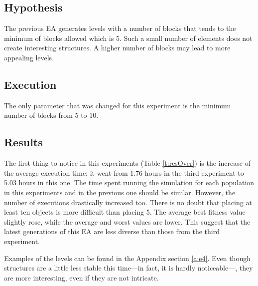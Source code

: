 \subsection{Hypothesis}
The previous \acs{EA} generates levels with a number of blocks that tends to the minimum of blocks allowed which is 5. Such a small number of elements does not create interesting structures. A higher number of blocks may lead to more appealing levels.
\subsection{Execution}
The only parameter that was changed for this experiment is the minimum number of blocks from 5 to 10. 
\subsection{Results}
The first thing to notice in this experiments (Table \ref{t:resOver}) is the increase of the average execution time: it went from 1.76 hours in the third experiment to 5.03 hours in this one. The time spent running the simulation for each population in this experiments and in the previous one should be similar. However, the number of executions drastically increased too. There is no doubt that placing at least ten objects is more difficult than placing 5. The average best fitness value slightly rose, while the average and worst values are lower. This suggest that the latest generations of this \acs{EA} are less diverse than those from the third experiment.

Examples of the levels can be found in the Appendix section \ref{a:e4}. Even though structures are a little less stable this time---in fact, it is hardly noticeable---, they are more interesting, even if they are not intricate.

